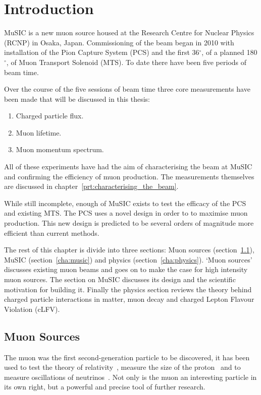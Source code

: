 \chapter{Introduction} %
\label{prt:introduction}
MuSIC is a new muon source housed at the Research Centre for Nuclear Physics (RCNP) in Osaka, Japan. Commissioning of the beam began in 2010 with installation of the Pion Capture System (PCS) and the first 36\(^{\circ}\), of a planned 180\(^{\circ}\), of Muon Transport Solenoid (MTS). To date there have been five periods of beam time.

Over the course of the five sessions of beam time three core measurements have been made that will be discussed in this thesis:
\begin{enumerate}
  \item Charged particle flux.
  \item Muon lifetime.
  \item Muon momentum spectrum.
\end{enumerate}
All of these experiments have had the aim of characterising the beam at MuSIC and confirming the efficiency of muon production. The measurements themselves are discussed in chapter~\ref{prt:characterising_the_beam}.

While still incomplete, enough of MuSIC exists to test the efficacy of the PCS and existing MTS. The PCS uses a novel design in order to to maximise muon production. This new design is predicted to be several orders of magnitude more efficient than current methods.

The rest of this chapter is divide into three sections: Muon sources (section~\ref{cha:high_intensity_muon_sources}), MuSIC (section~\ref{cha:music}) and physics (section~\ref{cha:physics}). `Muon sources' discusses existing muon beams and goes on to make the case for high intensity muon sources. The section on MuSIC discusses its design and the scientific motivation for building it. Finally the physics section reviews the theory behind charged particle interactions in matter, muon decay and charged Lepton Flavour Violation (cLFV).

\section{Muon Sources} %
\label{cha:high_intensity_muon_sources}
The muon was the first second-generation particle to be discovered, it has been used to test the theory of relativity~\cite{rossi_hall_first_muons}, measure the size of the proton~\cite{proton_size} and to measure oscillations of neutrinos~\cite{t2k_cdr}. Not only is the muon an interesting particle in its own right, but a powerful and precise tool of further research. 

